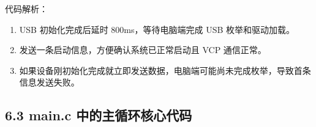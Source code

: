 \documentclass[
  chinese,
  UTF8,
  oneside,
  openany]{ctexbook}
\providecommand{\tightlist}{%
  \setlength{\itemsep}{0pt}\setlength{\parskip}{0pt}}
\begin{document}
代码解析：

\begin{enumerate}
\def\labelenumi{\arabic{enumi}.}
\tightlist
\item
  USB 初始化完成后延时 800ms，等待电脑端完成 USB 枚举和驱动加载。
\item
  发送一条启动信息，方便确认系统已正常启动且 VCP 通信正常。
\item
  如果设备刚初始化完成就立即发送数据，电脑端可能尚未完成枚举，导致首条信息发送失败。
\end{enumerate}

\subsection{6.3 main.c
中的主循环核心代码}\label{main.c-ux4e2dux7684ux4e3bux5faaux73afux6838ux5fc3ux4ee3ux7801-1}
\end{document}
